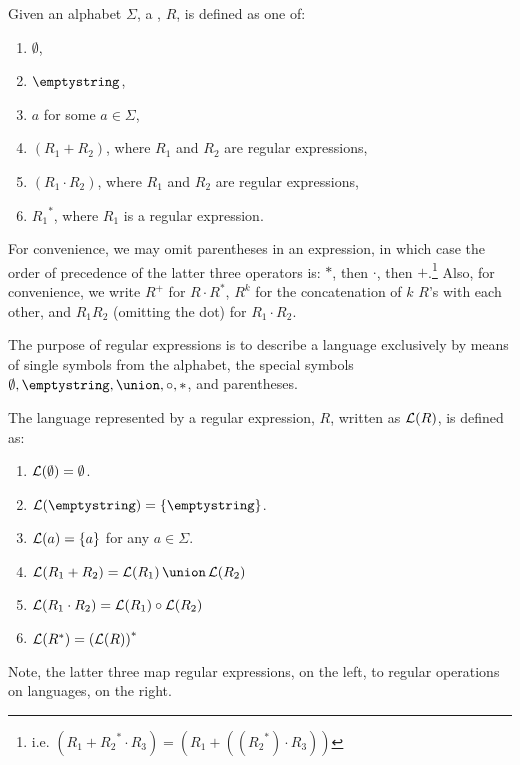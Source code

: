 \documentclass[twoside,letterpaper,openany]{book}
\begin{document}
\begin{defn}
Given an alphabet $\Sigma$, a , $R$, is defined as one of:
\begin{enumerate}
\item $\emptyset$,
\item $\emptystring$,
\item $a$ for some $a \in \Sigma$,
\item $(R_1 + R_2)$, where $R_1$ and $R_2$ are regular expressions,
\item $(R_1 \cdot R_2)$, where $R_1$ and $R_2$ are regular expressions,
\item ${R_1}^*$, where $R_1$ is a regular expression.
\end{enumerate}

For convenience, we may omit parentheses in an expression, in which case the order of precedence of the latter three operators is: $*$, then $\cdot$, then $+$.\footnote{i.e. $(R_1 + {R_2}^* \cdot R_3) = (R_1 + (({R_2}^*) \cdot R_3))$ } Also, for convenience, we write $R^+$ for $R \cdot R^*$, $R^k$ for the concatenation of $k$ $R$'s with each other, and $R_1 R_2$ (omitting the dot) for $R_1 \cdot R_2$.
\end{defn}

\begin{discussion}
The purpose of regular expressions is to describe a language exclusively by means of single symbols from the alphabet, the special symbols $\emptyset, \emptystring, \union, \circ, *$, and parentheses.
\end{discussion}

\begin{defn}
The language represented by a regular expression, $R$, written as $\mathcal{L}(R)$, is defined as:
\begin{enumerate}
\item $\mathcal{L}(\emptyset) = \emptyset$.
\item $\langof\emptystring = \setdef\emptystring$.
\item $\mathcal{L}(a) = \left\lbrace a \right\rbrace$ for any $a \in \Sigma$.
\item $\langof{R_1 + R_2} = \setunion{\langof{R_1}}{\langof{R_2}}$
\item $\mathcal{L}(R_1 \cdot R_2) = {\mathcal{L}(R_1)}\circ{\mathcal{L}(R_2)}$
\item $\mathcal{L}(R^*) = \left(\mathcal{L}(R)\right)^*$
\end{enumerate}
Note, the latter three map regular expressions, on the left, to regular operations on languages, on the right.
\end{defn}
\end{document}
